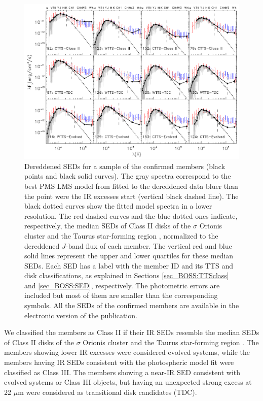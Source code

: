 \documentclass[12pt]{article}
\begin{document}
\begin{figure}[ht!]
	\centering
	\includegraphics[width=1.0\textwidth]{f8.pdf}
	\caption[SEDs of the confirmed members from the BOSS spectra]{Dereddened SEDs for a sample of the confirmed members (black points and black solid curves). The gray spectra correspond to the best PMS LMS model from \citet{Baraffe2015} fitted to the dereddened data bluer than the point were the IR excesses start (vertical black dashed line). The black dotted curves show the fitted \citet{Baraffe2015} model spectra in a lower resolution. The red dashed curves and the blue dotted ones indicate, respectively, the median SEDs of Class II disks of the $\sigma$ Orionis cluster \citep{Hernandez2007a} and the Taurus star-forming region \citep{Furlan2006}, normalized to the dereddened $J$-band flux of each member. The vertical red and blue solid lines represent the upper and lower quartiles for these median SEDs. Each SED has a label with the member ID and its TTS and disk classifications, as explained in Sections \ref{sec_BOSS:TTSclass} and \ref{sec_BOSS:SED}, respectively. The photometric errors are included but most of them are smaller than the corresponding symbols. All the SEDs of the confirmed members are available in the electronic version of the \citealt{Suarez2017} publication.}
	\label{fig_BOSS:SEDs}
\end{figure}

We classified the members as Class II if their IR SEDs resemble the median SEDs of Class II disks of the $\sigma$ Orionis cluster \citep{Hernandez2007a} and the Taurus star-forming region \citep{Furlan2006}. The members showing lower IR excesses were considered evolved systems, while the members having IR SEDs consistent with the photospheric \citet{Baraffe2015} model fit were classified as Class III. The members showing a near-IR SED consistent with evolved systems or Class III objects, but having an unexpected strong excess at 22 $\mu$m were considered as transitional disk candidates (TDC).
\end{document}
